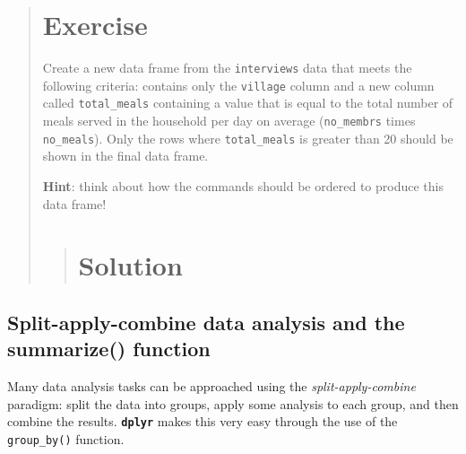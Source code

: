 \documentclass[]{book}
\newenvironment{Shaded}{\begin{snugshade}}{\end{snugshade}}
\newcommand{\KeywordTok}[1]{\textcolor[rgb]{0.13,0.29,0.53}{\textbf{#1}}}
\newcommand{\DataTypeTok}[1]{\textcolor[rgb]{0.13,0.29,0.53}{#1}}
\newcommand{\DecValTok}[1]{\textcolor[rgb]{0.00,0.00,0.81}{#1}}
\newcommand{\StringTok}[1]{\textcolor[rgb]{0.31,0.60,0.02}{#1}}
\newcommand{\OperatorTok}[1]{\textcolor[rgb]{0.81,0.36,0.00}{\textbf{#1}}}
\newcommand{\NormalTok}[1]{#1}
\begin{document}
\begin{quote}
\section{Exercise}\label{exercise-6}

Create a new data frame from the \texttt{interviews} data that meets the
following criteria: contains only the \texttt{village} column and a new
column called \texttt{total\_meals} containing a value that is equal to
the total number of meals served in the household per day on average
(\texttt{no\_membrs} times \texttt{no\_meals}). Only the rows where
\texttt{total\_meals} is greater than 20 should be shown in the final
data frame.

\textbf{Hint}: think about how the commands should be ordered to produce
this data frame!

\begin{quote}
\section{Solution}\label{solution-5}

\begin{Shaded}
\end{Shaded}
\end{quote}
\end{quote}

\subsection{Split-apply-combine data analysis and the summarize()
function}\label{split-apply-combine-data-analysis-and-the-summarize-function}

Many data analysis tasks can be approached using the
\emph{split-apply-combine} paradigm: split the data into groups, apply
some analysis to each group, and then combine the results.
\textbf{\texttt{dplyr}} makes this very easy through the use of the
\texttt{group\_by()} function.
\end{document}
